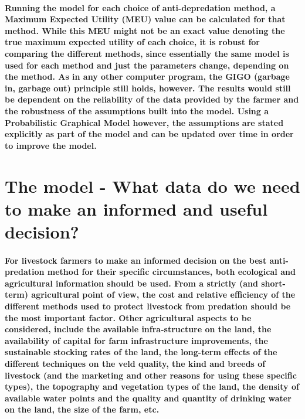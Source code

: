 \paragraph{Running the model for each choice of anti-depredation method, a Maximum
Expected Utility (MEU) value can be calculated for that method. While
this MEU might not be an exact value denoting the true maximum expected
utility of each choice, it is robust for comparing the different methods,
since essentially the same model is used for each method and just
the parameters change, depending on the method. As in any other computer
program, the GIGO (garbage in, garbage out) principle still holds,
however. The results would still be dependent on the reliability of
the data provided by the farmer and the robustness of the assumptions
built into the model. Using a Probabilistic Graphical Model however,
the assumptions are stated explicitly as part of the model and can
be updated over time in order to improve the model.}

\section{The model - What data do we need to make an informed and useful decision?}

\paragraph{For livestock farmers to make an informed decision on the best anti-predation
method for their specific circumstances, both ecological and agricultural
information should be used. From a strictly (and short-term) agricultural
point of view, the cost and relative efficiency of the different methods
used to protect livestock from predation should be the most important
factor. Other agricultural aspects to be considered, include the available
infra-structure on the land, the availability of capital for farm
infrastructure improvements, the sustainable stocking rates of the
land, the long-term effects of the different techniques on the veld
quality, the kind and breeds of livestock (and the marketing and other
reasons for using these specific types), the topography and vegetation
types of the land, the density of available water points and the quality
and quantity of drinking water on the land, the size of the farm,
etc. }

